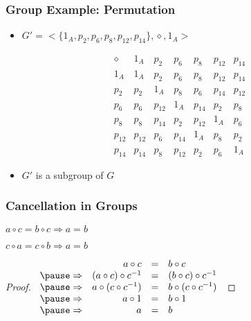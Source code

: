 \documentclass[dvipsnames]{beamer}
\begin{document}
\begin{frame}
  \frametitle{Group Example: Permutation}

  \begin{itemize}
    \item $G'=<\{1_A,p_2,p_6,p_8,p_{12},p_{14}\},\diamond,1_A>$
  \end{itemize}

  \[
    \begin{array}{c||c|c|c|c|c|c}
      \diamond & 1_{A}  & p_{2}  & p_{6}  & p_{8}  & p_{12} & p_{14}\\\hline\hline
      1_{A}    & 1_{A}  & p_{2}  & p_{6}  & p_{8}  & p_{12} & p_{14}\\\hline
      p_{2}    & p_{2}  & 1_{A}  & p_{8}  & p_{6}  & p_{14} & p_{12}\\\hline
      p_{6}    & p_{6}  & p_{12} & 1_{A}  & p_{14} & p_{2}  & p_{8}\\\hline
      p_{8}    & p_{8}  & p_{14} & p_{2}  & p_{12} & 1_{A}  & p_{6}\\\hline
      p_{12}   & p_{12} & p_{6}  & p_{14} & 1_{A}  & p_{8}  & p_{2}\\\hline
      p_{14}   & p_{14} & p_{8}  & p_{12} & p_{2}  & p_{6}  & 1_{A}
    \end{array}
  \]

  \pause
  \bigskip
  \begin{itemize}
    \item $G'$ is a subgroup of $G$
  \end{itemize}
\end{frame}

\begin{frame}
  \frametitle{Cancellation in Groups}

  \begin{theorem}
    $a \circ c = b \circ c \Rightarrow a = b$

    $c \circ a = c \circ b \Rightarrow a = b$
  \end{theorem}

  \pause
  \begin{proof}
    $\begin{array}{crcl}
                  & a \circ c                & = & b \circ c\\ \pause
      \Rightarrow & (a \circ c) \circ c^{-1} & = & (b \circ c) \circ c^{-1}\\ \pause
      \Rightarrow & a \circ (c \circ c^{-1}) & = & b \circ (c \circ c^{-1})\\ \pause
      \Rightarrow & a \circ 1                & = & b \circ 1\\ \pause
      \Rightarrow & a                        & = & b
    \end{array}$

  \end{proof}
\end{frame}
\end{document}
